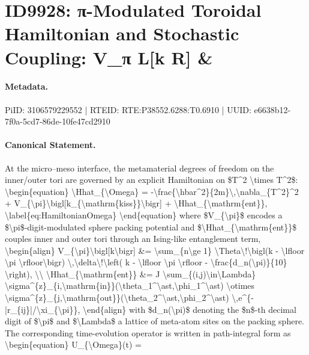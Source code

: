 \section*{ID9928: π-Modulated Toroidal Hamiltonian and Stochastic Coupling: V\_π L[k R] \&}
\paragraph{Metadata.}
PiID: 3106579229552 | RTEID: RTE:P38552.6288:T0.6910 | UUID: e6638b12-7f0a-5cd7-86de-10fe47cd2910

\paragraph{Canonical Statement.}
At the micro--meso interface, the metamaterial degrees of freedom on the inner/outer tori are governed by an explicit Hamiltonian on \$T\textasciicircum{}2 \textbackslash{}times T\textasciicircum{}2\$: \textbackslash{}begin\{equation\} \textbackslash{}Hhat\_\{\textbackslash{}Omega\} = -\textbackslash{}frac\{\textbackslash{}hbar\textasciicircum{}2\}\{2m\}\textbackslash{},\textbackslash{}nabla\_\{T\textasciicircum{}2\}\textasciicircum{}2 + V\_\{\textbackslash{}pi\}\textbackslash{}bigl[k\_\{\textbackslash{}mathrm\{kiss\}\}\textbackslash{}bigr] + \textbackslash{}Hhat\_\{\textbackslash{}mathrm\{ent\}\}, \textbackslash{}label\{eq:HamiltonianOmega\} \textbackslash{}end\{equation\} where \$V\_\{\textbackslash{}pi\}\$ encodes a \$\textbackslash{}pi\$-digit-modulated sphere packing potential and \$\textbackslash{}Hhat\_\{\textbackslash{}mathrm\{ent\}\}\$ couples inner and outer tori through an Ising-like entanglement term, \textbackslash{}begin\{align\} V\_\{\textbackslash{}pi\}\textbackslash{}bigl[k\textbackslash{}bigr] \&= \textbackslash{}sum\_\{n\textbackslash{}ge 1\} \textbackslash{}Theta\textbackslash{}!\textbackslash{}bigl(k - \textbackslash{}lfloor \textbackslash{}pi \textbackslash{}rfloor\textbackslash{}bigr) \textbackslash{},\textbackslash{}delta\textbackslash{}!\textbackslash{}left( k - \textbackslash{}lfloor \textbackslash{}pi \textbackslash{}rfloor - \textbackslash{}frac\{d\_n(\textbackslash{}pi)\}\{10\} \textbackslash{}right), \textbackslash{}\textbackslash{} \textbackslash{}Hhat\_\{\textbackslash{}mathrm\{ent\}\} \&= J \textbackslash{}sum\_\{(i,j)\textbackslash{}in\textbackslash{}Lambda\} \textbackslash{}sigma\textasciicircum{}\{z\}\_\{i,\textbackslash{}mathrm\{in\}\}(\textbackslash{}theta\_1\textasciicircum{}\textbackslash{}ast,\textbackslash{}phi\_1\textasciicircum{}\textbackslash{}ast) \textbackslash{}otimes \textbackslash{}sigma\textasciicircum{}\{z\}\_\{j,\textbackslash{}mathrm\{out\}\}(\textbackslash{}theta\_2\textasciicircum{}\textbackslash{}ast,\textbackslash{}phi\_2\textasciicircum{}\textbackslash{}ast) \textbackslash{},e\textasciicircum{}\{-|r\_\{ij\}|/\textbackslash{}xi\_\{\textbackslash{}pi\}\}, \textbackslash{}end\{align\} with \$d\_n(\textbackslash{}pi)\$ denoting the \$n\$-th decimal digit of \$\textbackslash{}pi\$ and \$\textbackslash{}Lambda\$ a lattice of meta-atom sites on the packing sphere. The corresponding time-evolution operator is written in path-integral form as \textbackslash{}begin\{equation\} U\_\{\textbackslash{}Omega\}(t) = 